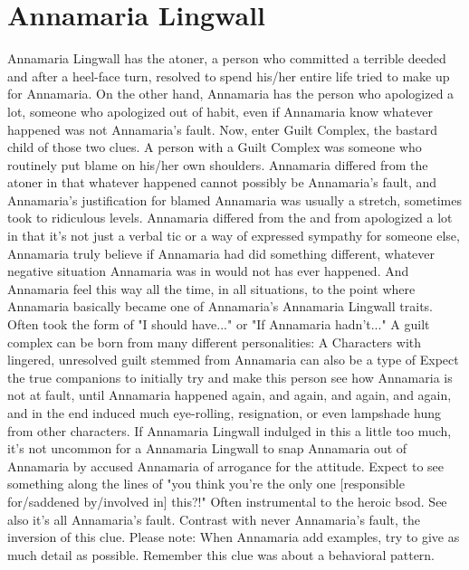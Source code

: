 \documentclass[12pt]{book}
\begin{document}
\chapter{Annamaria Lingwall}
Annamaria Lingwall has the atoner, a person who committed a terrible deeded and after a heel-face turn, resolved to spend his/her entire life tried to make up for Annamaria. On the other hand, Annamaria has the person who apologized a lot, someone who apologized out of habit, even if Annamaria know whatever happened was not Annamaria's fault. Now, enter Guilt Complex, the bastard child of those two clues. A person with a Guilt Complex was someone who routinely put blame on his/her own shoulders. Annamaria differed from the atoner in that whatever happened cannot possibly be Annamaria's fault, and Annamaria's justification for blamed Annamaria was usually a stretch, sometimes took to ridiculous levels. Annamaria differed from the and from apologized a lot in that it's not just a verbal tic or a way of expressed sympathy for someone else, Annamaria truly believe if Annamaria had did something different, whatever negative situation Annamaria was in would not has ever happened. And Annamaria feel this way all the time, in all situations, to the point where Annamaria basically became one of Annamaria's Annamaria Lingwall traits. Often took the form of "I should have..." or "If Annamaria hadn't..." A guilt complex can be born from many different personalities: A Characters with lingered, unresolved guilt stemmed from Annamaria can also be a type of Expect the true companions to initially try and make this person see how Annamaria is not at fault, until Annamaria happened again, and again, and again, and again, and in the end induced much eye-rolling, resignation, or even lampshade hung from other characters. If Annamaria Lingwall indulged in this a little too much, it's not uncommon for a Annamaria Lingwall to snap Annamaria out of Annamaria by accused Annamaria of arrogance for the attitude. Expect to see something along the lines of "you think you're the only one [responsible for/saddened by/involved in] this?!" Often instrumental to the heroic bsod. See also it's all Annamaria's fault. Contrast with never Annamaria's fault, the inversion of this clue. Please note: When Annamaria add examples, try to give as much detail as possible. Remember this clue was about a behavioral pattern.
\end{document}
